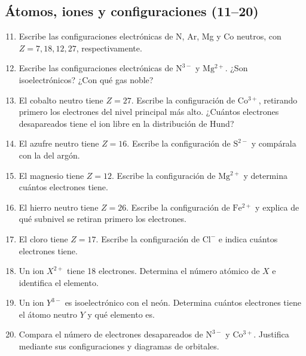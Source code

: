 \documentclass[12pt, letterpaper]{article}
\begin{document}
\subsection{Átomos, iones y configuraciones (11--20)}
\begin{enumerate}[leftmargin=*, label=\textbf{\arabic*.}]
  \setcounter{enumi}{10}
  \item \medio{} Escribe las configuraciones electrónicas de N, Ar, Mg y Co neutros, con $Z=7,18,12,27$, respectivamente.
  \item \medio{} Escribe las configuraciones electrónicas de $\mathrm{N^{3-}}$ y $\mathrm{Mg^{2+}}$. ¿Son isoelectrónicos? ¿Con qué gas noble?
  \item \dificil{} El cobalto neutro tiene $Z=27$. Escribe la configuración de $\mathrm{Co^{3+}}$, retirando primero los electrones del nivel principal más alto. ¿Cuántos electrones desapareados tiene el ion libre en la distribución de Hund?
  \item \medio{} El azufre neutro tiene $Z=16$. Escribe la configuración de $\mathrm{S^{2-}}$ y compárala con la del argón.
  \item \medio{} El magnesio tiene $Z=12$. Escribe la configuración de $\mathrm{Mg^{2+}}$ y determina cuántos electrones tiene.
  \item \dificil{} El hierro neutro tiene $Z=26$. Escribe la configuración de $\mathrm{Fe^{2+}}$ y explica de qué subnivel se retiran primero los electrones.
  \item \medio{} El cloro tiene $Z=17$. Escribe la configuración de $\mathrm{Cl^-}$ e indica cuántos electrones tiene.
  \item \medio{} Un ion $X^{2+}$ tiene 18 electrones. Determina el número atómico de $X$ e identifica el elemento.
  \item \dificil{} Un ion $Y^{3-}$ es isoelectrónico con el neón. Determina cuántos electrones tiene el átomo neutro $Y$ y qué elemento es.
  \item \dificil{} Compara el número de electrones desapareados de $\mathrm{N^{3-}}$ y $\mathrm{Co^{3+}}$. Justifica mediante sus configuraciones y diagramas de orbitales.
\end{enumerate}
\end{document}
